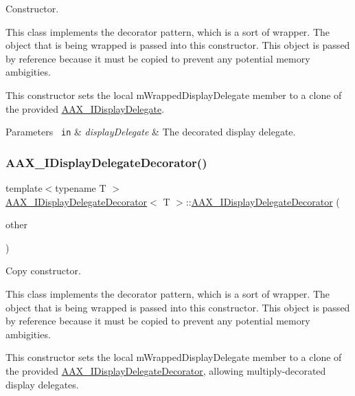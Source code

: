 Constructor. 

This class implements the decorator pattern, which is a sort of wrapper. The object that is being wrapped is passed into this constructor. This object is passed by reference because it must be copied to prevent any potential memory ambigities.

This constructor sets the local m\+Wrapped\+Display\+Delegate member to a clone of the provided \mbox{\hyperlink{a01801}{A\+A\+X\+\_\+\+I\+Display\+Delegate}}.


\begin{DoxyParams}[1]{Parameters}
\mbox{\texttt{ in}}  & {\em display\+Delegate} & The decorated display delegate. \\
\hline
\end{DoxyParams}
\mbox{\label{a01805_a5e3239fa6b4289dd7b3f99ce8ac1243d}} 
\subsubsection{\texorpdfstring{AAX\_IDisplayDelegateDecorator()}{AAX\_IDisplayDelegateDecorator()}\hspace{0.1cm}{\footnotesize\ttfamily [2/2]}}
{\footnotesize\ttfamily template$<$typename T $>$ \\
\mbox{\hyperlink{a01805}{A\+A\+X\+\_\+\+I\+Display\+Delegate\+Decorator}}$<$ T $>$\+::\mbox{\hyperlink{a01805}{A\+A\+X\+\_\+\+I\+Display\+Delegate\+Decorator}} (\begin{DoxyParamCaption}\item[{const \mbox{\hyperlink{a01805}{A\+A\+X\+\_\+\+I\+Display\+Delegate\+Decorator}}$<$ T $>$ \&}]{other }\end{DoxyParamCaption})}



Copy constructor. 

This class implements the decorator pattern, which is a sort of wrapper. The object that is being wrapped is passed into this constructor. This object is passed by reference because it must be copied to prevent any potential memory ambigities.

This constructor sets the local m\+Wrapped\+Display\+Delegate member to a clone of the provided \mbox{\hyperlink{a01805}{A\+A\+X\+\_\+\+I\+Display\+Delegate\+Decorator}}, allowing multiply-\/decorated display delegates.


